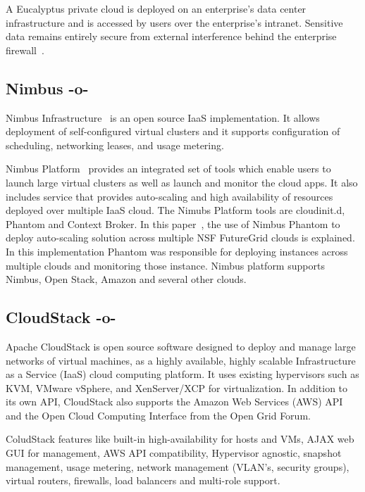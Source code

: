 A Eucalyptus private cloud is deployed on an enterprise's data center
infrastructure and is accessed by users over the enterprise's
intranet. Sensitive data remains entirely secure from external
interference behind the enterprise firewall~\cite{www-eucalyptus}.

     
\subsection{Nimbus -o-}

Nimbus Infrastructure~\cite{www-nimbus-wiki} is an open source IaaS
implementation. It allows deployment of self-configured virtual
clusters and it supports configuration of scheduling, networking
leases, and usage metering.

Nimbus Platform~\cite{www-nimbus} provides an integrated set of tools
which enable users to launch large virtual clusters as well as launch
and monitor the cloud apps. It also includes service that provides
auto-scaling and high availability of resources deployed over multiple
IaaS cloud.  The Nimubs Platform tools are cloudinit.d, Phantom and
Context Broker.  In this paper~\cite{nimbus-paper}, the use of Nimbus
Phantom to deploy auto-scaling solution across multiple NSF FutureGrid
clouds is explained. In this implementation Phantom was responsible
for deploying instances across multiple clouds and monitoring those
instance.  Nimbus platform supports Nimbus, Open Stack, Amazon and
several other clouds.

\subsection{CloudStack -o-}

Apache CloudStack is open source software designed to deploy and
manage large networks of virtual machines, as a highly available,
highly scalable Infrastructure as a Service (IaaS) cloud computing
platform. It uses existing hypervisors such as KVM, VMware vSphere,
and XenServer/XCP for virtualization. In addition to its own API,
CloudStack also supports the Amazon Web Services (AWS) API and the
Open Cloud Computing Interface from the Open Grid
Forum.~\cite{www-cloudstack}

ColudStack features like built-in high-availability for hosts and VMs,
AJAX web GUI for management, AWS API compatibility, Hypervisor
agnostic, snapshot management, usage metering, network management
(VLAN's, security groups), virtual routers, firewalls, load balancers
and multi-role support.~\cite{www-cloudstack-wikipedia}
	  
